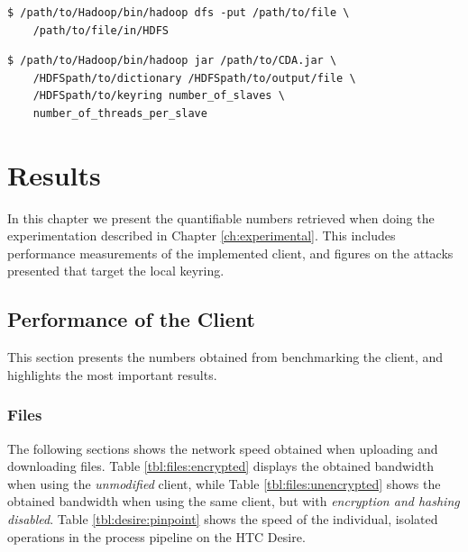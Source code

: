 \documentclass[pdftex,english,10pt,b5paper,twoside]{book}
\begin{document}
\lstset{language=bash, label=lst:cpHDFS, caption=Copying files into HDFS}
\begin{lstlisting}
$ /path/to/Hadoop/bin/hadoop dfs -put /path/to/file \
    /path/to/file/in/HDFS
\end{lstlisting}

\lstset{language=bash, label=lst:CDA, caption=Executing the CDA Attack}
\begin{lstlisting}
$ /path/to/Hadoop/bin/hadoop jar /path/to/CDA.jar \
    /HDFSpath/to/dictionary /HDFSpath/to/output/file \
    /HDFSpath/to/keyring number_of_slaves \
    number_of_threads_per_slave
\end{lstlisting}

\chapter{Results}
\label{ch:results}

In this chapter we present the quantifiable numbers retrieved when doing the
experimentation described in Chapter \ref{ch:experimental}. This includes
performance measurements of the implemented client, and figures on the attacks
presented that target the local keyring.

\section{Performance of the Client}

This section presents the numbers obtained from benchmarking the client, and
highlights the most important results.

\subsection{Files}

The following sections shows the network speed obtained when uploading and
downloading files. Table \ref{tbl:files:encrypted} displays the obtained
bandwidth when using the \emph{unmodified} client, while Table
\ref{tbl:files:unencrypted} shows the obtained bandwidth when using the same
client, but with \emph{encryption and hashing disabled}. Table
\ref{tbl:desire:pinpoint} shows the speed of the individual, isolated
operations in the process pipeline on the HTC Desire.




\end{document}
